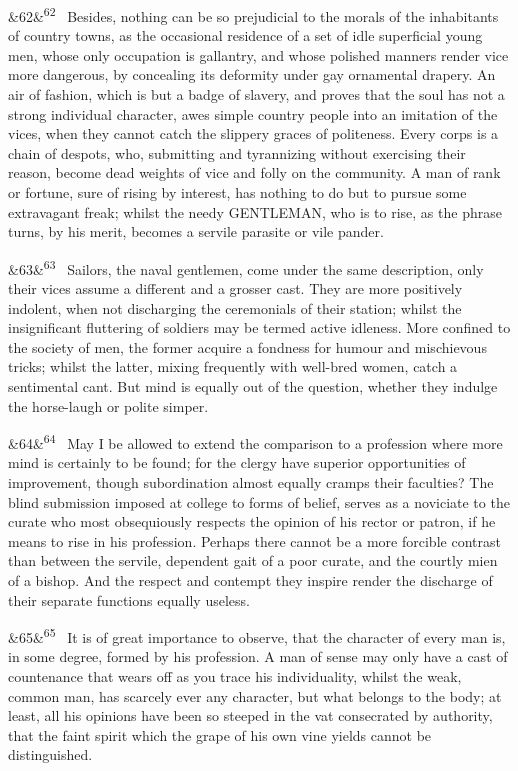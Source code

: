\documentclass[12pt]{article}
\newcommand{\para}[1][]{\par\noindent\ifx&#1&\else\textsuperscript{\footnotesize #1}~\fi}
\begin{document}
\para[62] Besides, nothing can be so prejudicial to the morals of the inhabitants of country towns, as the occasional residence of a set of idle superficial young men, whose only occupation is gallantry, and whose polished manners render vice more dangerous, by concealing its deformity under gay ornamental drapery. An air of fashion, which is but a badge of slavery, and proves that the soul has not a strong individual character, awes simple country people into an imitation of the vices, when they cannot catch the slippery graces of politeness. Every corps is a chain of despots, who, submitting and tyrannizing without exercising their reason, become dead weights of vice and folly on the community. A man of rank or fortune, sure of rising by interest, has nothing to do but to pursue some extravagant freak; whilst the needy GENTLEMAN, who is to rise, as the phrase turns, by his merit, becomes a servile parasite or vile pander.

\para[63] Sailors, the naval gentlemen, come under the same description, only their vices assume a different and a grosser cast. They are more positively indolent, when not discharging the ceremonials of their station; whilst the insignificant fluttering of soldiers may be termed active idleness. More confined to the society of men, the former acquire a fondness for humour and mischievous tricks; whilst the latter, mixing frequently with well-bred women, catch a sentimental cant. But mind is equally out of the question, whether they indulge the horse-laugh or polite simper.

\para[64] May I be allowed to extend the comparison to a profession where more mind is certainly to be found; for the clergy have superior opportunities of improvement, though subordination almost equally cramps their faculties? The blind submission imposed at college to forms of belief, serves as a noviciate to the curate who most obsequiously respects the opinion of his rector or patron, if he means to rise in his profession. Perhaps there cannot be a more forcible contrast than between the servile, dependent gait of a poor curate, and the courtly mien of a bishop. And the respect and contempt they inspire render the discharge of their separate functions equally useless.

\para[65] It is of great importance to observe, that the character of every man is, in some degree, formed by his profession. A man of sense may only have a cast of countenance that wears off as you trace his individuality, whilst the weak, common man, has scarcely ever any character, but what belongs to the body; at least, all his opinions have been so steeped in the vat consecrated by authority, that the faint spirit which the grape of his own vine yields cannot be distinguished.
\end{document}
